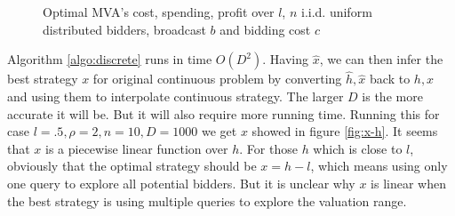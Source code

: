 \begin{figure}
\centering
    \caption{Optimal MVA's cost, spending, profit over $l$, $n$ i.i.d. uniform distributed bidders,
      broadcast $b$ and bidding cost $c$}
\end{figure}

Algorithm \ref{algo:discrete} runs in time $O(D^2)$. Having $\hat x$, we can
then infer the best strategy $x$ for original continuous problem by converting
$\hat h, \hat x$ back to $h, x$ and using them to interpolate continuous
strategy.  The larger $D$ is the more accurate it will be. But it will also
require more running time.  Running this for case $l = .5, \rho = 2, n = 10, D
= 1000$ we get $x$ showed in figure \ref{fig:x-h}. It seems that $x$ is a
piecewise linear function over $h$.  For those $h$ which is close to
$l$, obviously that the optimal strategy should be $x = h - l$,
which means using only one query to explore all potential bidders. But it is
unclear why $x$ is linear when the best strategy is using multiple queries to
explore the valuation range.


